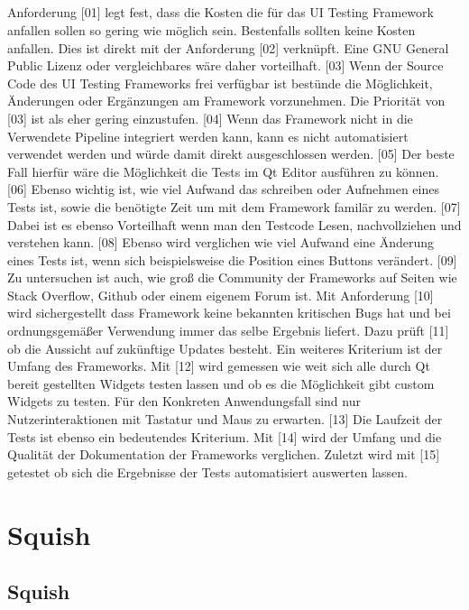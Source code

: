 		\paragraph{}Anforderung [01] legt fest, dass die Kosten die für das UI Testing Framework anfallen sollen so gering wie möglich sein. Bestenfalls sollten keine Kosten anfallen. Dies ist direkt mit der Anforderung [02] verknüpft. Eine GNU General Public Lizenz oder vergleichbares wäre daher vorteilhaft. [03] Wenn der Source Code des UI Testing Frameworks frei verfügbar ist bestünde die Möglichkeit, Änderungen oder Ergänzungen am Framework vorzunehmen. Die Priorität von [03] ist als eher gering einzustufen. [04] Wenn das Framework nicht in die Verwendete Pipeline integriert werden kann, kann es nicht automatisiert verwendet werden und würde damit direkt ausgeschlossen werden. [05] Der beste Fall hierfür wäre die Möglichkeit die Tests im Qt Editor ausführen zu können. [06] Ebenso wichtig ist, wie viel Aufwand das schreiben oder Aufnehmen eines Tests ist, sowie die benötigte Zeit um mit dem Framework familär zu werden. [07] Dabei ist es ebenso Vorteilhaft wenn man den Testcode Lesen, nachvollziehen und verstehen kann. [08] Ebenso wird verglichen wie viel Aufwand eine Änderung eines Tests ist, wenn sich beispielsweise die Position eines Buttons verändert. [09] Zu untersuchen ist auch, wie groß die Community der Frameworks auf Seiten wie Stack Overflow, Github oder einem eigenem Forum ist. Mit Anforderung [10] wird sichergestellt dass Framework keine bekannten kritischen Bugs hat und bei ordnungsgemäßer Verwendung immer das selbe Ergebnis liefert. Dazu prüft [11] ob die Aussicht auf zukünftige Updates besteht. Ein weiteres Kriterium ist der Umfang des Frameworks. Mit [12] wird gemessen wie weit sich alle durch Qt bereit gestellten Widgets testen lassen und ob es die Möglichkeit gibt custom Widgets zu testen. Für den Konkreten Anwendungsfall sind nur Nutzerinteraktionen mit Tastatur und Maus zu erwarten. [13] Die Laufzeit der Tests ist ebenso ein bedeutendes Kriterium. Mit [14] wird der Umfang und die Qualität der Dokumentation der Frameworks verglichen. Zuletzt wird mit [15] getestet ob sich die Ergebnisse der Tests automatisiert auswerten lassen.

\chapter{Squish}
		
		\section{Squish}
